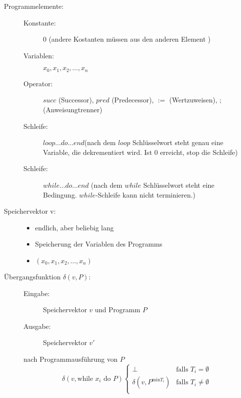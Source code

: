 \documentclass{bschlangaul-theorie}
\begin{document}
\begin{description}
\item[Programmelemente:] \strut

\begin{description}
\item[Konstante:]
$0$ (andere Kostanten müssen aus den anderen Element )

\item[Variablen:]
$x_0, x_1, x_2, \dots, x_n$

\item[Operator:]

$succ$ (Successor), $pred$ (Predecessor), $:=$ (Wertzuweisen), $;$ (Anweisungtrenner)

\item[Schleife:]

 $loop \dots do \dots end$(nach dem $loop$ Schlüsselwort steht genau eine
Variable, die dekrementiert wird. Ist 0 erreicht, stop die Schleife)

\item[Schleife:]

$while \dots do \dots end$
(nach dem $while$ Schlüsselwort steht eine Bedingung. $while$-Schleife
kann nicht terminieren.)
\end{description}

\item[Speichervektor v:] \strut

\begin{itemize}
\item endlich, aber beliebig lang
\item Speicherung der Variablen des Programms
\item $(x_0, x_1, x_2, \dots, x_n)$
 \end{itemize}

\item[Übergangsfunktion $\delta(v, P)$:] \strut

\begin{description}
\item[Eingabe:] Speichervektor $v$ und Programm $P$
\item[Ausgabe:] Speichervektor $v'$
\end{description}

nach Programmausführung von $P$
\begin{equation*}
\delta(v, \text{while }x_i\text{ do }P)
\begin{cases}
\bot & \text{falls }T_i = \emptyset\\
\delta(v, P^{\text{min}T_i}) & \text{falls }T_i \neq \emptyset\\
\end{cases}
\end{equation*}
\end{description}
\end{document}
